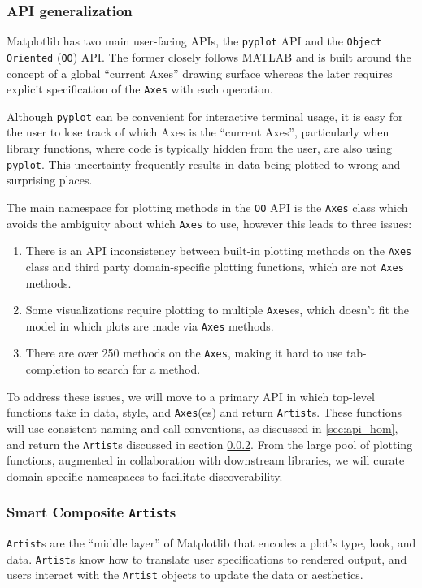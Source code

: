 \documentclass[11pt,letterpaper]{article}  %
\begin{document}
\subsubsection{API generalization}
\label{sec:api_gen}
Matplotlib has two main user-facing APIs, the \texttt{pyplot} API and
the \texttt{Object Oriented} (\texttt{OO}) API.  The former closely
follows MATLAB and is built around the concept of a global ``current
Axes'' drawing surface whereas the later requires explicit specification
of the \texttt{Axes} with each operation.

Although \texttt{pyplot} can be convenient for interactive terminal
usage, it is easy for the user to lose track of which Axes is the
``current Axes'', particularly when library functions, where code is
typically hidden from the user, are also using \texttt{pyplot}.  This
uncertainty frequently results in data being plotted to wrong and
surprising places.


The main namespace for plotting methods in the \texttt{OO} API is
the \texttt{Axes} class which avoids the ambiguity about which
\texttt{Axes} to use, however this
leads to three issues:
\begin{enumerate}
\item There is an API inconsistency between built-in plotting methods
  on the \texttt{Axes} class and third party domain-specific plotting
  functions, which are not \texttt{Axes} methods.
\item Some visualizations require plotting to multiple
  \texttt{Axes}es, which doesn't fit the model in which plots are made
  via \texttt{Axes} methods.
\item There are over 250 methods on the \texttt{Axes}, making it hard
  to use tab-completion to search for a method.
\end{enumerate}

To address these issues, we will move to a primary API in which
top-level functions take in data, style, and \texttt{Axes}(es) and
return \texttt{Artist}s.  These functions will use consistent naming
and call conventions, as discussed in \ref{sec:api_hom}, and return the
\texttt{Artist}s discussed in section \ref{sec:artists}. From the
large pool of plotting functions, augmented in collaboration with
downstream libraries, we will curate domain-specific namespaces to
facilitate discoverability.


\subsubsection{Smart Composite \texttt{Artist}s}
\label{sec:artists}
\texttt{Artist}s are the ``middle layer'' of Matplotlib that encodes a
plot's type, look, and data.  \texttt{Artist}s know how to translate
user specifications to rendered output, and users interact with the
\texttt{Artist} objects to update the data or aesthetics.
\end{document}
